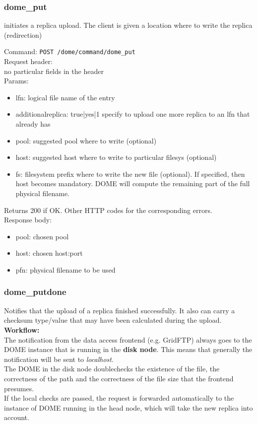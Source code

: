 \documentclass[a4paper,10pt]{scrreprt}
\begin{document}
\subsubsection{dome\_put}
initiates a replica upload. The client is given a location where to write the replica (redirection)

Command:
\lstinline"POST /dome/command/dome_put"\\
Request header:\\
 no particular fields in the header\\
Params:
\begin{itemize}
 \item lfn: logical file name of the entry
 \item additionalreplica: true|yes|1   specify to upload one more replica to an lfn that already has
 \item pool: suggested pool where to write (optional)
 \item host: suggested host where to write to particular filesys (optional)
 \item fs: filesystem prefix where to write the new file (optional). If specified, then host becomes mandatory. DOME will compute the remaining part of the full physical filename.
\end{itemize}



Returns 200 if OK. Other HTTP codes for the corresponding errors.\\
Response body:
\begin{itemize}
 \item pool: chosen pool
 \item host: chosen host:port
 \item pfn: physical filename to be used
\end{itemize}

\subsubsection{dome\_putdone}
Notifies that the upload of a replica finished successfully. It also can carry a checksum type/value that may have been calculated during the upload.\\

\textbf{Workflow:}\\
The notification from the data access frontend (e.g. GridFTP) always goes to the DOME instance that is running in the \textbf{disk node}. This means that
generally the notification will be sent to \textit{localhost}.\\
The DOME in the disk node doublechecks the existence of the file, the correctness of the path and the correctness of the file size that the frontend presumes.\\
If the local checks are passed, the request is forwarded automatically to the instance of DOME running in the head node, which will take the new replica into account.
\end{document}
